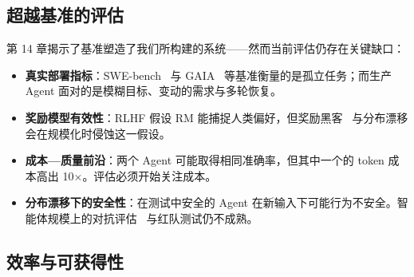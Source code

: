 \subsection{超越基准的评估}
\label{evaluation-beyond-benchmarks}

第 14 章揭示了基准塑造了我们所构建的系统——然而当前评估仍存在关键缺口：

\begin{itemize}
  \item \textbf{真实部署指标}：SWE-bench~\cite{jimenez2024swebench} 与 GAIA~\cite{mialon2023gaia} 等基准衡量的是孤立任务；而生产 Agent 面对的是模糊目标、变动的需求与多轮恢复。
  \item \textbf{奖励模型有效性}：RLHF 假设 RM 能捕捉人类偏好，但奖励黑客~\cite{skalse2022defining} 与分布漂移会在规模化时侵蚀这一假设。
  \item \textbf{成本—质量前沿}：两个 Agent 可能取得相同准确率，但其中一个的 token 成本高出 10$\times$。评估必须开始关注成本。
  \item \textbf{分布漂移下的安全性}：在测试中安全的 Agent 在新输入下可能行为不安全。智能体规模上的对抗评估~\cite{perez2022red} 与红队测试仍不成熟。
\end{itemize}

\subsection{效率与可获得性}
\label{efficiency-and-accessibility}

